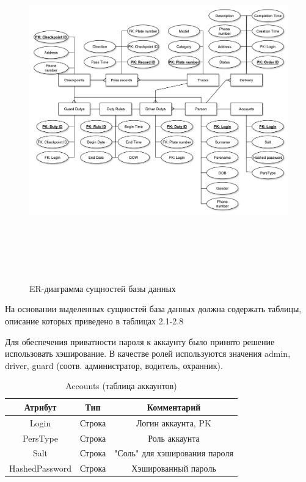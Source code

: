 \begin{figure}[ph!] \label{er_db}
	\begin{center}
		{\includegraphics[height=14cm, width = 15cm]{schemes/er_db.pdf}}
		\caption{ER-диаграмма сущностей базы данных}
	\end{center}
\end{figure}

На основании выделенных сущностей база данных должна содержать таблицы, описание которых приведено в таблицах 2.1-2.8

Для обеспечения приватности пароля к аккаунту было принято решение использовать хэширование. В качестве ролей используются значения admin, driver, guard (соотв. администратор, водитель, охранник).
\begin{table}[h] \label{acc_table}
	\begin{center}
	\caption{Accounts (таблица аккаунтов)}
	\begin{tabular}{| c | c | c |}
		\hline
		\textbf{Атрибут}		&	\textbf{Тип}		& \textbf{Комментарий} \\
		\hline
		Login 		&	Строка		&	Логин аккаунта, PK \\ \hline
		PersType 	&	Строка 		&	Роль аккаунта \\ \hline
		Salt 		&	Строка		&	"Соль" для хэширования пароля \\ \hline
		HashedPassword & Строка		&	Хэшированный пароль \\ \hline
	\end{tabular}
	\end{center}
\end{table}

